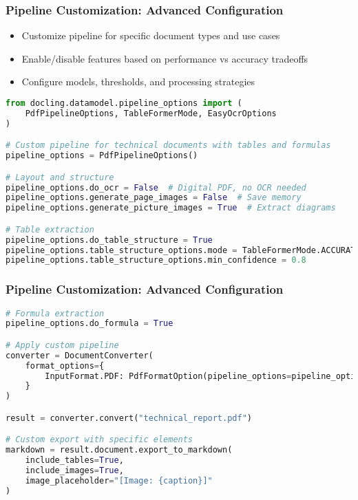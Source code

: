 \begin{frame}[fragile]\frametitle{Pipeline Customization: Advanced Configuration}
      \begin{itemize}
          \item Customize pipeline for specific document types and use cases
          \item Enable/disable features based on performance vs accuracy tradeoffs
          \item Configure models, thresholds, and processing strategies
      \end{itemize}
      
\begin{lstlisting}[language=Python, basicstyle=\tiny]
from docling.datamodel.pipeline_options import (
    PdfPipelineOptions, TableFormerMode, EasyOcrOptions
)

# Custom pipeline for technical documents with tables and formulas
pipeline_options = PdfPipelineOptions()

# Layout and structure
pipeline_options.do_ocr = False  # Digital PDF, no OCR needed
pipeline_options.generate_page_images = False  # Save memory
pipeline_options.generate_picture_images = True  # Extract diagrams

# Table extraction
pipeline_options.do_table_structure = True
pipeline_options.table_structure_options.mode = TableFormerMode.ACCURATE
pipeline_options.table_structure_options.min_confidence = 0.8

\end{lstlisting}
\end{frame}


\begin{frame}[fragile]\frametitle{Pipeline Customization: Advanced Configuration}
      
\begin{lstlisting}[language=Python, basicstyle=\tiny]
# Formula extraction
pipeline_options.do_formula = True

# Apply custom pipeline
converter = DocumentConverter(
    format_options={
        InputFormat.PDF: PdfFormatOption(pipeline_options=pipeline_options)
    }
)

result = converter.convert("technical_report.pdf")

# Custom export with specific elements
markdown = result.document.export_to_markdown(
    include_tables=True,
    include_images=True,
    image_placeholder="[Image: {caption}]"
)
\end{lstlisting}
\end{frame}


